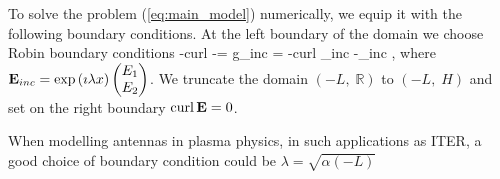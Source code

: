 To solve the problem (\ref{eq:main_model}) numerically, we equip it with the following boundary conditions.
At the left boundary of the domain we choose Robin boundary conditions 
\be
-curl \E -\imath \lambda\E \wedge \n = g_{inc} = -curl \E_{inc} -\imath\lambda\E_{inc} \wedge \n,
\ee
where ${\bf E}_{inc} = \exp \left(\imath \lambda x\right)\begin{pmatrix} E_1\\ E_2 \end{pmatrix}$. We truncate the domain 
$(-L,\; \mathbb{R})$ to $(-L,\; H)$ and set on the right boundary $\operatorname{curl} {\bf E} = 0$. 
\begin{remark}
	When modelling antennas in plasma physics, in such applications as ITER, 
	a good choice of boundary condition could be $\lambda = \sqrt{\alpha(-L)}$
\end{remark}
